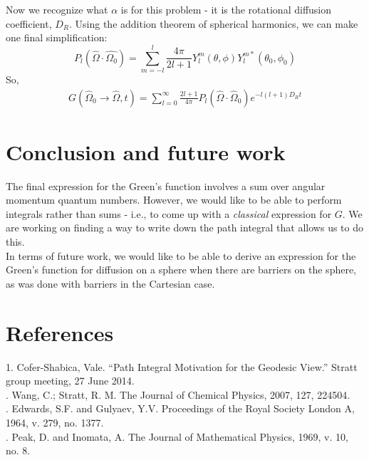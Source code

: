 \documentclass[12pt,a4paper]{article}
\begin{document}
Now we recognize what $\alpha$ is for this problem - it is the rotational diffusion coefficient, $D_R$. Using the addition theorem of spherical harmonics, we can make one final simplification:
\[
P_l(\hat{\Omega}\cdot\hat{\Omega_0}) =\sum_{m=-l}^l \frac{4\pi}{2l+1}Y_l^m(\theta, \phi)Y_l^{m*}(\theta_0, \phi_0)
\]
So,
\begin{align*}
G(\hat{\Omega}_0\rightarrow \hat{\Omega}, t) = \sum_{l=0}^{\infty}\frac{2l+1}{4\pi}P_l(\hat{\Omega}\cdot\hat{\Omega}_0)e^{-l(l+1)D_Rt}
\end{align*}

\section{Conclusion and future work}
The final expression for the  Green's function involves a sum over angular momentum quantum numbers. However, we would like to be able to perform integrals rather than sums - i.e., to come up with a \textit{classical} expression for $G$. We are working on finding a way to write down the path integral that allows us to do this. \\

In terms of future work, we would like to be able to derive an expression for the Green's function for diffusion on a sphere when there are barriers on the sphere, as was done with barriers in the Cartesian case. 
\section{References}
1. Cofer-Shabica, Vale. ``Path Integral Motivation for the Geodesic View.'' Stratt group meeting, 27 June 2014. \\

. Wang, C.; Stratt, R. M. The Journal of Chemical Physics, 2007, 127, 224504.\\

. Edwards, S.F. and Gulyaev, Y.V. Proceedings of the Royal Society London A, 1964, v. 279, no. 1377.\\

. Peak, D. and Inomata, A. The Journal of Mathematical Physics, 1969, v. 10, no. 8.
\end{document}
